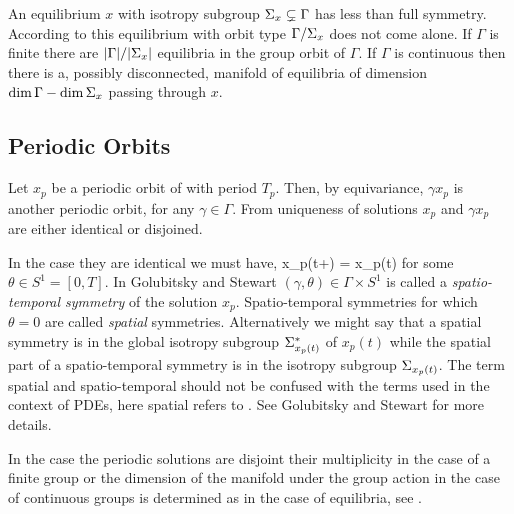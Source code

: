 An equilibrium $x$ with isotropy subgroup $\Sigma_{x}\subsetneq\Gamma$ has less than full symmetry. According
to   this equilibrium with orbit type $\Gamma/\Sigma_{x}$ does not come alone. If $\Gamma$ is finite there are  $|\Gamma|/|\Sigma_{x}|$ equilibria in the group orbit of $\Gamma$. If $\Gamma$ is continuous then there is a, possibly disconnected, manifold of equilibria of dimension $\dim \Gamma - \dim \Sigma_{x}$ passing through $x$.

\subsection{Periodic Orbits}
\label{sec:poSym}

Let $x_p$ be a periodic orbit of  with period $T_p$. Then, by equivariance, $\gamma x_p$
is another periodic orbit, for any $\gamma\in\Gamma$. From uniqueness of solutions $x_p$ and $\gamma x_p$
are either identical or disjoined. 

In the case they are identical we must have,
\beq
	\gamma x_p(t+\theta) = x_p(t)
\eeq
for some $\theta\in S^{1}=[0,T]$. In Golubitsky and Stewart $(\gamma,\theta)\in \Gamma \times S^1$ is called a \emph{spatio-temporal
symmetry} of the solution $x_p$. Spatio-temporal symmetries for which $\theta=0$ are called \emph{spatial}
symmetries. Alternatively we might say that a spatial symmetry is in the global isotropy subgroup $\Sigma^*_{x_p(t)}$ of $x_p(t)$ while the spatial part of a spatio-temporal symmetry is in the isotropy subgroup $\Sigma_{x_p(t)}$.
The term spatial and spatio-temporal should not be confused with the terms used in the context of PDEs, here
spatial refers to \statesp. See Golubitsky and Stewart for more details.

In the case the periodic solutions are disjoint their multiplicity in the case of a finite group or the dimension
of the manifold under the group action in the case of continuous groups is determined as in the case of equilibria,
see .

